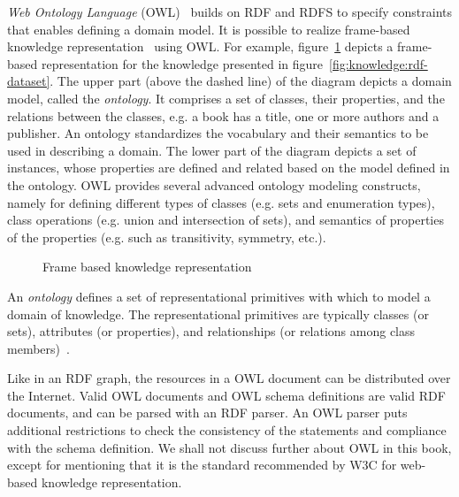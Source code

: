   
{\em Web Ontology Language} (OWL)~\citep{OWL:2004} builds on RDF and RDFS to specify constraints that enables defining a domain
model. It is possible to realize frame-based knowledge representation~\cite{Minsky:1974} using OWL. For example, 
figure~\ref{fig:knowledge:frame} depicts a frame-based representation for the knowledge presented in figure~\ref{fig:knowledge:rdf-dataset}.
The upper part (above the dashed line) of the diagram depicts a domain model, called the {\em ontology}. It comprises a set
of classes, their properties, and the relations between the classes, e.g. a book has a title, one or more authors and a publisher. 
An ontology standardizes the vocabulary and their semantics to be used in describing a domain.
The lower part of the diagram depicts a set of instances, whose properties are defined and related based on the model defined 
in the ontology.  OWL provides several advanced ontology modeling constructs, namely for defining different types of classes 
(e.g. sets and enumeration types), class operations (e.g. union and intersection of sets), and semantics of properties of the 
properties (e.g. such as transitivity, symmetry, etc.).

\begin{figure}[!htbp]
	\centerline{
	}
	\caption{Frame based knowledge representation}
	\label{fig:knowledge:frame}
\end{figure}

\begin{definition}[ontology]
	An {\em ontology} defines a set of representational primitives with which to model a domain of knowledge.
	The representational primitives are typically classes (or sets), attributes (or properties), and relationships 
	(or relations among class members)~\citep{Gruber:2008}. 
\end{definition}

 
Like in an RDF graph, the resources in a OWL document can be distributed over the Internet. Valid OWL documents and OWL schema 
definitions are valid RDF documents, and can be parsed with an RDF parser. An OWL parser puts additional restrictions to check 
the consistency of the statements and compliance with the schema definition. We shall not discuss further about OWL in this book, 
except for mentioning that it is the standard recommended by W3C for web-based knowledge representation. 

